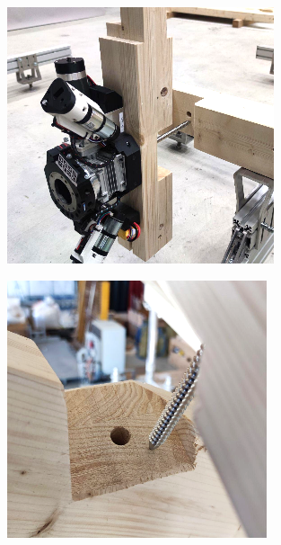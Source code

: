 \documentclass[11pt]{book}
\begin{document}
\begin{figure}[H]
\centering
\begin{subfigure}[b]{0.45\textwidth}
\centering
\includegraphics[width=\textwidth]{./images/image96.png}
\end{subfigure}
\hfill
\begin{subfigure}[b]{0.45\textwidth}
\centering
\includegraphics[width=\textwidth]{./images/image97.png}
\end{subfigure}
\end{figure}
\end{document}
